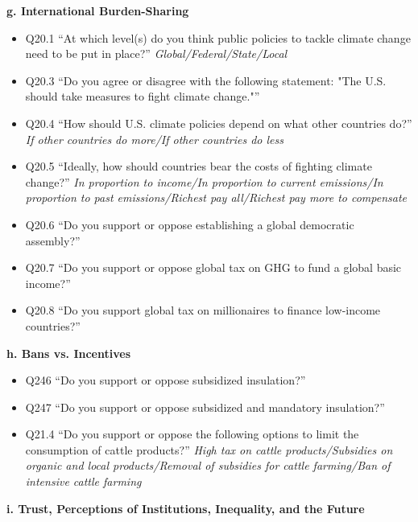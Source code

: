 \documentclass{article}
\begin{document}
\begin{flushleft}
\textbf{g. International Burden-Sharing}
\end{flushleft}

\begin{itemize}
    \item Q20.1 ``At which level(s) do you think public policies to tackle climate change need to be put in place?'' \textit{Global/Federal/State/Local}
    \item Q20.3 ``Do you agree or disagree with the following statement: "The U.S. should take measures to fight climate change."''
    \item Q20.4 ``How should U.S. climate policies depend on what other countries do?'' \textit{If other countries do more/If other countries do less}
    \item Q20.5 ``Ideally, how should countries bear the costs of fighting climate change?'' \textit{In proportion to income/In proportion to current emissions/In proportion to past emissions/Richest pay all/Richest pay more to compensate}
    \item Q20.6 ``Do you support or oppose establishing a global democratic assembly?''
    \item Q20.7 ``Do you support or oppose global tax on GHG to fund a global basic income?''
    \item Q20.8 ``Do you support global tax on millionaires to finance low-income countries?''
\end{itemize}

\begin{flushleft}
\textbf{h. Bans vs. Incentives}
\end{flushleft}

\begin{itemize}
    \item Q246 ``Do you support or oppose subsidized insulation?''
    \item Q247 ``Do you support or oppose subsidized and mandatory insulation?''
    \item Q21.4 ``Do you support or oppose the following options to limit the consumption of cattle products?'' \textit{High tax on cattle products/Subsidies on organic and local products/Removal of subsidies for cattle farming/Ban of intensive cattle farming}
\end{itemize}

\begin{flushleft}
\textbf{i. Trust, Perceptions of Institutions, Inequality, and the Future}
\end{flushleft}
\end{document}
